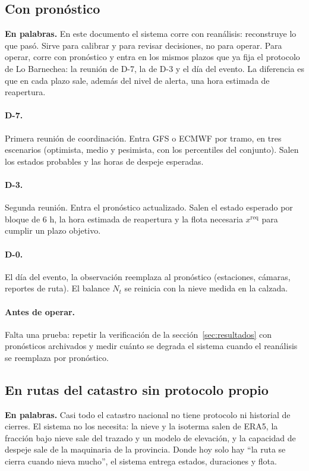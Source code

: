 \documentclass[11pt,a4paper]{article}
\newcommand{\enpalabras}[1]{%
  \par\smallskip\noindent\colorbox{caja}{\parbox{\dimexpr\linewidth-2\fboxsep}{\small\textbf{En palabras.} #1}}\par\smallskip}
\begin{document}
\subsection{Con pronóstico}
\enpalabras{En este documento el sistema corre con reanálisis: reconstruye lo que pasó. Sirve para calibrar y para revisar decisiones, no para operar. Para operar, corre con pronóstico y entra en los mismos plazos que ya fija el protocolo de Lo Barnechea: la reunión de D-7, la de D-3 y el día del evento. La diferencia es que en cada plazo sale, además del nivel de alerta, una hora estimada de reapertura.}

\paragraph{D-7.} Primera reunión de coordinación. Entra GFS o ECMWF por tramo, en tres escenarios (optimista, medio y pesimista, con los percentiles del conjunto). Salen los estados probables y las horas de despeje esperadas.

\paragraph{D-3.} Segunda reunión. Entra el pronóstico actualizado. Salen el estado esperado por bloque de 6 h, la hora estimada de reapertura y la flota necesaria $x^{\mathrm{req}}$ para cumplir un plazo objetivo.

\paragraph{D-0.} El día del evento, la observación reemplaza al pronóstico (estaciones, cámaras, reportes de ruta). El balance $N_t$ se reinicia con la nieve medida en la calzada.

\paragraph{Antes de operar.} Falta una prueba: repetir la verificación de la sección~\ref{sec:resultados} con pronósticos archivados y medir cuánto se degrada el sistema cuando el reanálisis se reemplaza por pronóstico.

\subsection{En rutas del catastro sin protocolo propio}
\enpalabras{Casi todo el catastro nacional no tiene protocolo ni historial de cierres. El sistema no los necesita: la nieve y la isoterma salen de ERA5, la fracción bajo nieve sale del trazado y un modelo de elevación, y la capacidad de despeje sale de la maquinaria de la provincia. Donde hoy solo hay ``la ruta se cierra cuando nieva mucho'', el sistema entrega estados, duraciones y flota.}
\end{document}
